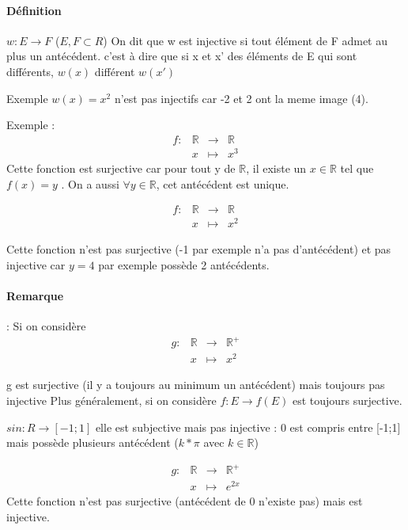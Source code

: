 \paragraph{Définition} $w : E \rightarrow F$ ($E, F \subset R$)
On dit que w est injective si tout élément de F admet au plus un antécédent.
c'est à dire que si x et x' des éléments de E qui sont différents, $w(x)$ différent $w(x')$

Exemple $w(x) = x^2$ n'est pas injectifs car -2 et 2 ont la meme image (4).

Exemple :
\begin{align*}
	f : & \mathbb{R} & \rightarrow & \mathbb{R} \\
	& x & \mapsto & x^3
\end{align*}
Cette fonction est surjective car pour tout y de $\mathbb{R}$, il existe un $x \in \mathbb{R}$ tel que $f(x) = y$ . On a aussi $\forall y \in \mathbb{R}$, cet antécédent est unique.

\begin{align*}
	f : & \mathbb{R} & \rightarrow & \mathbb{R} \\
	& x & \mapsto & x^2
\end{align*}

Cette fonction n'est pas surjective (-1 par exemple n'a pas d'antécédent) et pas injective car $y=4$ par exemple possède 2 antécédents.

\paragraph{Remarque} : Si on considère 
\begin{align*}
	g : & \mathbb{R} & \rightarrow & \mathbb{R}^+ \\
	& x & \mapsto & x^2
\end{align*}

g est surjective (il y a toujours au minimum un antécédent) mais toujours pas injective
Plus généralement, si on considère $f:E \rightarrow f(E)$ est toujours surjective.

$sin : R \rightarrow [-1;1]$ elle est subjective mais pas injective : 0 est compris entre [-1;1] mais possède plusieurs antécédent ($k*\pi$ avec $k\in\mathbb{R}$)


\begin{align*}
	g : & \mathbb{R} & \rightarrow & \mathbb{R}^+ \\
   & x & \mapsto & e^{2x}
\end{align*}
Cette fonction n'est pas surjective (antécédent de 0 n'existe pas) mais est injective.

